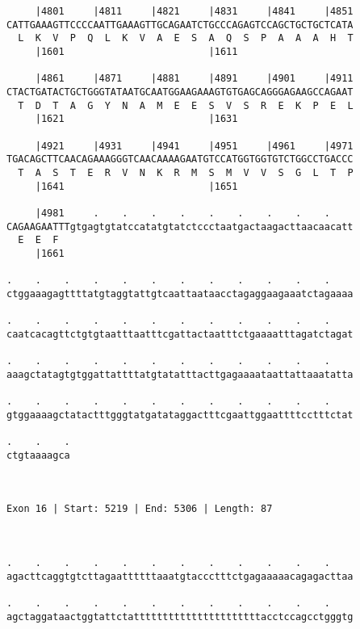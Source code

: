 \documentclass{article}
\begin{document}
\begin{Verbatim}
     |4801     |4811     |4821     |4831     |4841     |4851
CATTGAAAGTTCCCCAATTGAAAGTTGCAGAATCTGCCCAGAGTCCAGCTGCTGCTCATA
  L  K  V  P  Q  L  K  V  A  E  S  A  Q  S  P  A  A  A  H  T
     |1601                         |1611                    
  
     |4861     |4871     |4881     |4891     |4901     |4911
CTACTGATACTGCTGGGTATAATGCAATGGAAGAAAGTGTGAGCAGGGAGAAGCCAGAAT
  T  D  T  A  G  Y  N  A  M  E  E  S  V  S  R  E  K  P  E  L
     |1621                         |1631                    
  
     |4921     |4931     |4941     |4951     |4961     |4971
TGACAGCTTCAACAGAAAGGGTCAACAAAAGAATGTCCATGGTGGTGTCTGGCCTGACCC
  T  A  S  T  E  R  V  N  K  R  M  S  M  V  V  S  G  L  T  P
     |1641                         |1651                    
  
     |4981     .    .    .    .    .    .    .    .    .    
CAGAAGAATTTgtgagtgtatccatatgtatctccctaatgactaagacttaacaacatt
  E  E  F                                                   
     |1661                                                  
  
.    .    .    .    .    .    .    .    .    .    .    .    
ctggaaagagttttatgtaggtattgtcaattaataacctagaggaagaaatctagaaaa
                                                            
.    .    .    .    .    .    .    .    .    .    .    .    
caatcacagttctgtgtaatttaatttcgattactaatttctgaaaatttagatctagat
                                                            
.    .    .    .    .    .    .    .    .    .    .    .    
aaagctatagtgtggattattttatgtatatttacttgagaaaataattattaaatatta
                                                            
.    .    .    .    .    .    .    .    .    .    .    .    
gtggaaaagctatactttgggtatgatataggactttcgaattggaattttcctttctat
                                                            
.    .    .
ctgtaaaagca
           
           
 
Exon 16 | Start: 5219 | End: 5306 | Length: 87



.    .    .    .    .    .    .    .    .    .    .    .    
agacttcaggtgtcttagaattttttaaatgtaccctttctgagaaaaacagagacttaa
                                                            
.    .    .    .    .    .    .    .    .    .    .    .    
agctaggataactggtattctattttttttttttttttttttttacctccagcctgggtg
                                                            

\end{Verbatim}
\end{document}
